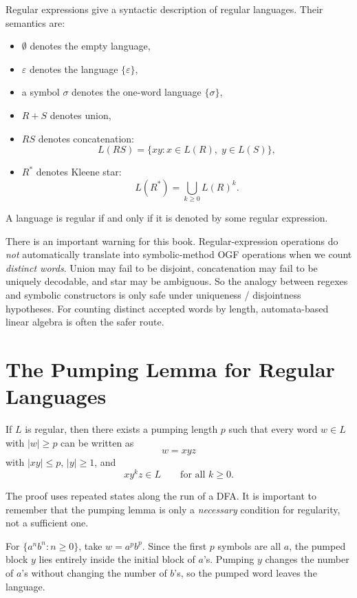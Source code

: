 Regular expressions give a syntactic description of regular languages. Their semantics are:
\begin{itemize}
  \item $\emptyset$ denotes the empty language,
  \item $\varepsilon$ denotes the language $\{\varepsilon\}$,
  \item a symbol $\sigma$ denotes the one-word language $\{\sigma\}$,
  \item $R+S$ denotes union,
  \item $RS$ denotes concatenation:
  \[
    L(RS) = \{xy : x \in L(R),\; y \in L(S)\},
  \]
  \item $R^*$ denotes Kleene star:
  \[
    L(R^*) = \bigcup_{k \ge 0} L(R)^k.
  \]
\end{itemize}

\begin{theorem}
A language is regular if and only if it is denoted by some regular expression.
\end{theorem}

There is an important warning for this book. Regular-expression operations do \emph{not} automatically translate into symbolic-method OGF operations when we count \emph{distinct words}. Union may fail to be disjoint, concatenation may fail to be uniquely decodable, and star may be ambiguous. So the analogy between regexes and symbolic constructors is only safe under uniqueness / disjointness hypotheses. For counting distinct accepted words by length, automata-based linear algebra is often the safer route.

\section{The Pumping Lemma for Regular Languages}

\begin{theorem}
If $L$ is regular, then there exists a pumping length $p$ such that every word $w \in L$ with $|w| \ge p$ can be written as
\[
  w = xyz
\]
with $|xy| \le p$, $|y| \ge 1$, and
\[
  xy^k z \in L \qquad \text{for all } k \ge 0.
\]
\end{theorem}

The proof uses repeated states along the run of a DFA. It is important to remember that the pumping lemma is only a \emph{necessary} condition for regularity, not a sufficient one.

For $\{a^n b^n : n \ge 0\}$, take $w=a^p b^p$. Since the first $p$ symbols are all $a$, the pumped block $y$ lies entirely inside the initial block of $a$'s. Pumping $y$ changes the number of $a$'s without changing the number of $b$'s, so the pumped word leaves the language.

